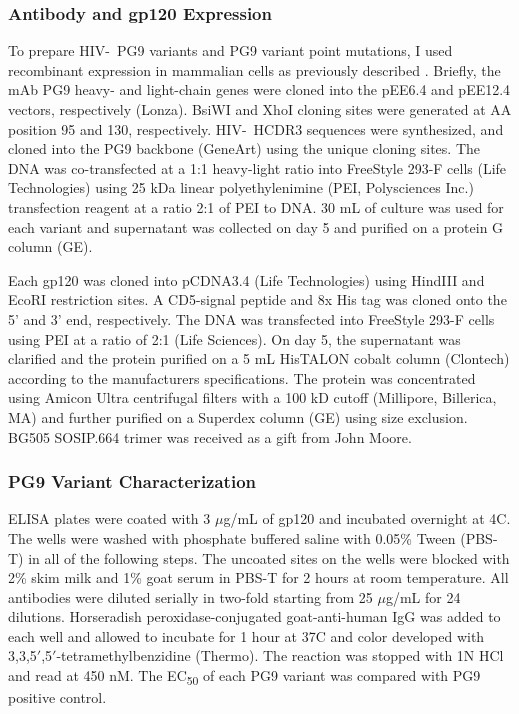 \subsubsection{Antibody and gp120 Expression}
To prepare HIV-\naive~PG9 variants and PG9 variant point mutations, I used recombinant expression in mammalian cells as previously described \citep{Xu:2010da}. Briefly, the mAb PG9 heavy- and light-chain genes were cloned into the pEE6.4 and pEE12.4 vectors, respectively (Lonza). BsiWI and XhoI cloning sites were generated at AA position 95 and 130, respectively. HIV-\naive~HCDR3 sequences were synthesized, and cloned into the PG9 backbone (GeneArt) using the unique cloning sites. The DNA was co-transfected at a 1:1 heavy-light ratio into FreeStyle 293-F cells (Life Technologies) using 25 kDa linear polyethylenimine (PEI, Polysciences Inc.) transfection reagent at a ratio 2:1 of PEI to DNA. 30 mL of culture was used for each variant and supernatant was collected on day 5 and purified on a protein G column (GE).

Each gp120 was cloned into pCDNA3.4 (Life Technologies) using HindIII and EcoRI restriction sites. A CD5-signal peptide and 8x His tag was cloned onto the 5' and 3' end, respectively. The DNA was transfected into FreeStyle 293-F cells using PEI at a ratio of 2:1 (Life Sciences). On day 5, the supernatant was clarified and the protein purified on a 5 mL HisTALON cobalt column (Clontech) according to the manufacturers specifications. The protein was concentrated using Amicon Ultra centrifugal filters with a 100 kD cutoff (Millipore, Billerica, MA) and further purified on a Superdex column (GE) using size exclusion. BG505 SOSIP.664 trimer was received as a gift from John Moore.

\subsubsection{PG9 Variant Characterization}
ELISA plates were coated with 3 $\mu$g/mL of gp120 and incubated overnight at 4\degree C. The wells were washed with phosphate buffered saline with 0.05\% Tween (PBS-T) in all of the following steps. The uncoated sites on the wells were blocked with 2\% skim milk and 1\% goat serum in PBS-T for 2 hours at room temperature.  All antibodies were diluted serially in two-fold starting from 25 $\mu$g/mL for 24 dilutions. Horseradish peroxidase-conjugated goat-anti-human IgG was added to each well and allowed to incubate for 1 hour at 37\degree C and color developed with 3,3,5$'$,5$'$-tetramethylbenzidine (Thermo). The reaction was stopped with 1N HCl and read at 450 nM. The EC\textsubscript{50} of each PG9 variant was compared with PG9 positive control.

